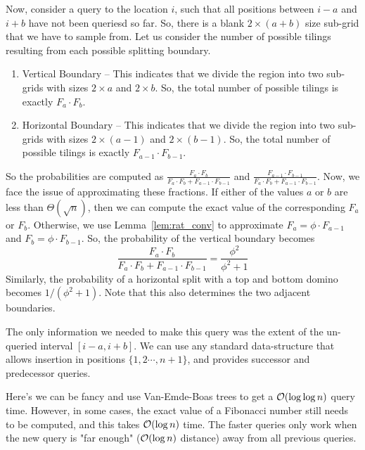 Now, consider a query to the location $i$, such that all positions between $i-a$ and $i+b$ have not been queriesd so far.
So, there is a blank $2\times(a+b)$ size sub-grid that we have to sample from.
Let us consider the number of possible tilings resulting from each possible splitting boundary.
\begin{enumerate}
    \item Vertical Boundary -- This indicates that we divide the region into two sub-grids with sizes
          $2\times a$ and $2\times b$.
          So, the total number of possible tilings is exactly $F_a\cdot F_b$.
    \item Horizontal Boundary -- This indicates that we divide the region into two sub-grids with sizes
          $2\times (a-1)$ and $2\times (b-1)$.
          So, the total number of possible tilings is exactly $F_{a-1}\cdot F_{b-1}$.
\end{enumerate}

So the probabilities are computed as $\frac{F_a\cdot F_b}{F_a\cdot F_b + F_{a-1}\cdot F_{b-1}}$
and $\frac{F_{a-1}\cdot F_{b-1}}{F_a\cdot F_b + F_{a-1}\cdot F_{b-1}}$.
Now, we face the issue of approximating these fractions.
If either of the values $a$ or $b$ are less than $\Theta(\sqrt n)$,
then we can compute the exact value of the corresponding $F_a$ or $F_b$.
Otherwise, we use Lemma~\ref{lem:rat_conv} to approximate $F_a=\phi\cdot F_{a-1}$ and $F_b=\phi\cdot F_{b-1}$.
So, the probability of the vertical boundary becomes
$$
\frac{F_a\cdot F_b}{F_a\cdot F_b + F_{a-1}\cdot F_{b-1}} = \frac{\phi^2}{\phi^2+1}
$$
Similarly, the probability of a horizontal split with a top and bottom domino becomes $1/(\phi^2+1)$.
Note that this also determines the two adjacent boundaries.

The only information we needed to make this query was the extent of the un-queried interval $[i-a, i+b]$.
We can use any standard data-structure that allows insertion in positions $\{1, 2\cdots,n+1\}$,
and provides successor and predecessor queries.

Here's we can be fancy and use Van-Emde-Boas trees to get a $\Bo(\log\log n)$ query time.
However, in some cases, the exact value of a Fibonacci number still needs to be computed, and this takes $\Bo(\log n)$ time.
The faster queries only work when the new query is "far enough" ($\Bo(\log n)$ distance) away from all previous queries.

